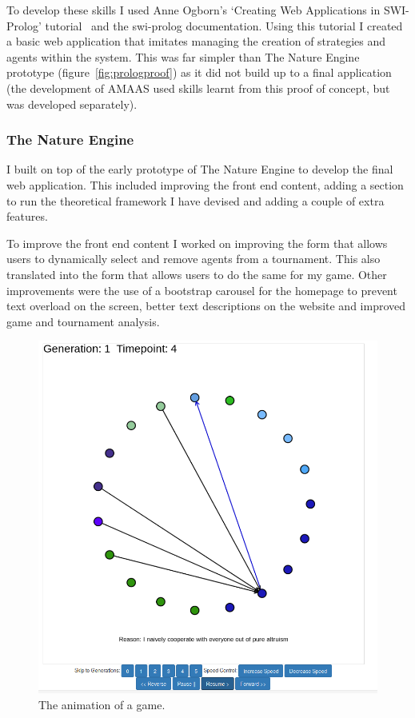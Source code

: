 \documentclass[]{final_report}
\begin{document}
To develop these skills I used Anne Ogborn's `Creating Web Applications in SWI-Prolog' tutorial~\cite{swi_web_tut} and the swi-prolog documentation. Using this tutorial I created a basic web application that imitates managing the creation of strategies and agents within the system. This was far simpler than The Nature Engine prototype (figure~\ref{fig:prologproof}) as it did not build up to a final application (the development of AMAAS used skills learnt from this proof of concept, but was developed separately).

\subsubsection{The Nature Engine}
I built on top of the early prototype of The Nature Engine to develop the final web application. This included improving the front end content, adding a section to run the theoretical framework I have devised and adding a couple of extra features.\par 
To improve the front end content I worked on improving the form that allows users to dynamically select and remove agents from a tournament. This also translated into the form that allows users to do the same for my game. Other improvements were the use of a bootstrap carousel for the homepage to prevent text overload on the screen, better text descriptions on the website and improved game and tournament analysis.\par 
\begin{figure}
\vspace{-20pt}
\begin{framed}
	\begin{center}
	\includegraphics[width=\textwidth]{Animation.png}
	\caption{The animation of a game.}
	\label{fig:animation}
	\end{center}
\end{framed}
\vspace{-20pt}
\end{figure}
\end{document}
